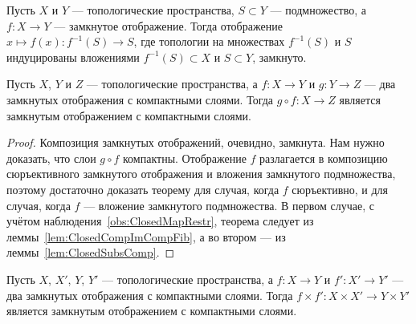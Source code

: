 \documentclass[
	extrafontsizes,
	11pt,
	hyphens,
]{memoir}
\begin{document}
\begin{observation}
Пусть \(X\) и \(Y\) --- топологические пространства, \(S \subset Y\) --- подмножество,
а \(f : X \to Y\) --- замкнутое отображение.
\label{obs:ClosedMapRestr}
Тогда отображение \(x \mapsto f(x) : f^{-1}(S) \to S\),
где топологии на множествах \(f^{-1}(S)\) и \(S\) индуцированы вложениями \(f^{-1}(S) \subset X\) и \(S \subset Y\),
замкнуто.
\end{observation}

\begin{theorem}
Пусть \(X\), \(Y\) и \(Z\) --- топологические пространства, а \(f : X \to Y\) и \(g : Y \to Z\) --- два замкнутых отображения с компактными слоями.
Тогда \(g \circ f : X \to Z\) является замкнутым отображением с компактными слоями.
\end{theorem}

\begin{proof}
Композиция замкнутых отображений, очевидно, замкнута.
Нам нужно доказать, что слои \(g \circ f\) компактны.
Отображение \(f\) разлагается в композицию сюръективного замкнутого отображения и вложения замкнутого подмножества, поэтому достаточно доказать теорему для случая, когда \(f\) сюръективно, и для случая, когда \(f\) --- вложение замкнутого подмножества.
В первом случае, с учётом наблюдения~\ref{obs:ClosedMapRestr}, теорема следует из леммы~\ref{lem:ClosedCompImCompFib}, а во втором --- из леммы~\ref{lem:ClosedSubsComp}.
\end{proof}

\begin{theorem}
Пусть \(X\), \(X'\), \(Y\), \(Y'\) --- топологические пространства, а \(f : X \to Y\) и \(f' : X' \to Y'\) --- два замкнутых отображения с компактными слоями.
\label{thm:prop_prod}
Тогда \(f \times f' : X \times X' \to Y \times Y'\) является замкнутым отображением с компактными слоями.
\end{theorem}
\end{document}
